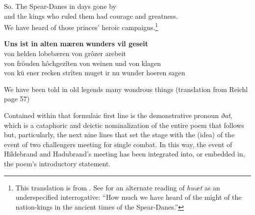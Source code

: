 So. The Spear-Danes in days gone by\\
and the kings who ruled them had courage and greatness.\\
We have heard of those princes’ heroic campaigns.\footnote{{This translation is from \citet{Heaney2000}. See \citet{Walkden2013} for an alternate reading of \textit{hwæt} as an underspecified interrogative: “How much we have heard of the might of the nation-kings in the ancient times of the Spear-Danes.”}}
  \z

\ea%
    \label{ex:6:19}
\textbf{Uns ist in alten mæren} \qquad \textbf{wunders vil geseit}\\
von helden lobebæren \qquad von grôzer arebeit\\
von fröuden hôchgezîten \qquad von weinen und von klagen\\
von ku\"{} ener recken strîten \qquad muget ir nu wunder hoeren sagen\\\medskip

We have been told in old legends many wondrous things (translation from Reichl page 57)
    \z

\begin{sloppypar}
\noindent Contained within that formulaic first line is the demonstrative pronoun \textit{ðat}, which is a cataphoric and deictic nominalization of the entire poem that follows but, particularly, the next nine lines that set the stage with the (idea) of the event of two challengers meeting for single combat. In this way, the event of Hildebrand and Hadubrand’s meeting has been integrated into, or embedded in, the poem’s introductory statement. 
\end{sloppypar}

